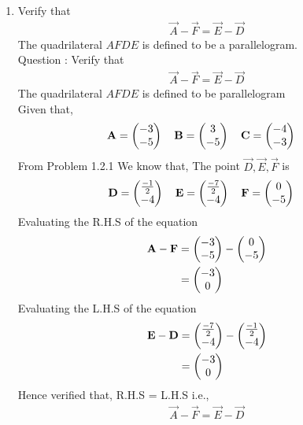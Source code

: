 \documentclass[11pt]{book}
\begin{document}
\begin{enumerate}[label=\thesection.\arabic*.,ref=\thesection.\theenumi]
\item Verify that 
		\begin{align}
\vec{A}-\vec{F}=\vec{E}-\vec{D}
		\end{align}
The quadrilateral $AFDE$ is defined to be a parallelogram.\\
Question : Verify that 
\begin{align}
	\vec{A}-\vec{F} = \vec{E}-\vec{D}
\end{align}
The quadrilateral $AFDE$ is defined to be parallelogram
\\ \solution 
Given that,
\begin{align}
    \mathbf{A} = \begin{pmatrix}-3\\-5\end{pmatrix}
    \quad
    \mathbf{B} &= \begin{pmatrix}3\\-5\end{pmatrix}
    \quad
    \mathbf{C} = \begin{pmatrix}-4\\-3\end{pmatrix}
\end{align}
From Problem 1.2.1 We know that, The point $\vec{D},\vec{E},\vec{F}$ is 
\begin{align}
    \mathbf{D} = \begin{pmatrix}\frac{-1}{2}\\ -4 \end{pmatrix}
    \quad
    \mathbf{E} &= \begin{pmatrix}\frac{-7}{2}\\-4\end{pmatrix}
    \quad
    \mathbf{F} = \begin{pmatrix}0\\ -5\end{pmatrix}
\end{align}
Evaluating the R.H.S of the equation
\begin{align}
    \mathbf{A}-\mathbf{F}&=\begin{pmatrix}-3\\-5\end{pmatrix}-\begin{pmatrix}0\\ -5 \end{pmatrix}\\
    &=\begin{pmatrix} -3 \\ 0 \end{pmatrix}
\end{align} 
Evaluating the L.H.S of the equation
\begin{align}
    \mathbf{E}-\mathbf{D}&=\begin{pmatrix}\frac{-7}{2}\\-4\end{pmatrix}-\begin{pmatrix}\frac{-1}{2}\\ -4 \end{pmatrix}\\
    &=\begin{pmatrix}-3 \\ 0 \end{pmatrix}
\end{align}
Hence verified that, R.H.S = L.H.S i.e.,
\begin{align}
	\vec{A}-\vec{F} = \vec{E}-\vec{D}
\end{align}
\begin{figure}
\centering

\end{figure}
\end{enumerate}
\end{document}
